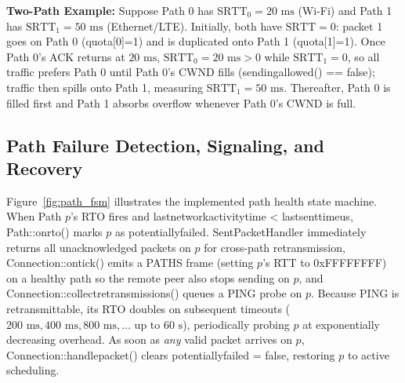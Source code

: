 \documentclass[10pt,a4paper]{article}
\newcommand{\codeul}{\textunderscore\hspace{0pt}}
\DeclareRobustCommand{\code}[1]{{\ttfamily\let\_\codeul #1}}
\begin{document}
\textbf{Two-Path Example:} Suppose Path 0 has $\text{SRTT}_0 = 20\text{ ms}$ (Wi-Fi) and Path 1 has $\text{SRTT}_1 = 50\text{ ms}$ (Ethernet/LTE). Initially, both have $\text{SRTT} = 0$: packet 1 goes on Path 0 (\code{quota[0]=1}) and is duplicated onto Path 1 (\code{quota[1]=1}). Once Path 0's ACK returns at $20\text{ ms}$, $\text{SRTT}_0 = 20\text{ ms} > 0$ while $\text{SRTT}_1 = 0$, so all traffic prefers Path 0 until Path 0's CWND fills (\code{sending\_allowed() == false}); traffic then spills onto Path 1, measuring $\text{SRTT}_1 = 50\text{ ms}$. Thereafter, Path 0 is filled first and Path 1 absorbs overflow whenever Path 0's CWND is full.

\subsection{Path Failure Detection, Signaling, and Recovery}
Figure~\ref{fig:path_fsm} illustrates the implemented path health state machine. When Path $p$'s RTO fires and \code{last\_network\_activity\_time < last\_sent\_time\_us}, \code{Path::on\_rto()} marks $p$ as \code{potentially\_failed}. \code{SentPacketHandler} immediately returns all unacknowledged packets on $p$ for cross-path retransmission, \code{Connection::on\_tick()} emits a \code{PATHS} frame (setting $p$'s RTT to \code{0xFFFFFFFF}) on a healthy path so the remote peer also stops sending on $p$, and \code{Connection::collect\_retransmissions()} queues a \code{PING} probe on $p$. Because \code{PING} is retransmittable, its RTO doubles on subsequent timeouts ($200\text{ ms}, 400\text{ ms}, 800\text{ ms}, \dots$ up to $60\text{ s}$), periodically probing $p$ at exponentially decreasing overhead. As soon as \emph{any} valid packet arrives on $p$, \code{Connection::handle\_packet()} clears \code{potentially\_failed = false}, restoring $p$ to active scheduling.
\end{document}
